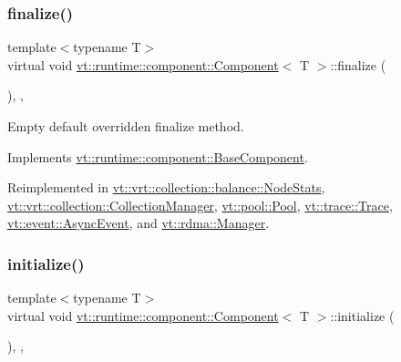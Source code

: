 \subsubsection{\texorpdfstring{finalize()}{finalize()}}
{\footnotesize\ttfamily template$<$typename T$>$ \\
virtual void \hyperlink{structvt_1_1runtime_1_1component_1_1_component}{vt\+::runtime\+::component\+::\+Component}$<$ T $>$\+::finalize (\begin{DoxyParamCaption}{ }\end{DoxyParamCaption})\hspace{0.3cm}{\ttfamily [inline]}, {\ttfamily [override]}, {\ttfamily [virtual]}}



Empty default overridden finalize method. 



Implements \hyperlink{structvt_1_1runtime_1_1component_1_1_base_component_ac03e2177ad2e26b1b8cb94c7e47e3eff}{vt\+::runtime\+::component\+::\+Base\+Component}.



Reimplemented in \hyperlink{structvt_1_1vrt_1_1collection_1_1balance_1_1_node_stats_a267ac0f73734b89797be774b0bd6e7d1}{vt\+::vrt\+::collection\+::balance\+::\+Node\+Stats}, \hyperlink{structvt_1_1vrt_1_1collection_1_1_collection_manager_afafcdbf36f42835471218b654252031c}{vt\+::vrt\+::collection\+::\+Collection\+Manager}, \hyperlink{structvt_1_1pool_1_1_pool_a45a2880809625a77bb93c3dfcd9c7603}{vt\+::pool\+::\+Pool}, \hyperlink{structvt_1_1trace_1_1_trace_a571333fa708843b1b24079eccfc3ba93}{vt\+::trace\+::\+Trace}, \hyperlink{structvt_1_1event_1_1_async_event_a77e3aafaae98603825556cdf8105ba57}{vt\+::event\+::\+Async\+Event}, and \hyperlink{structvt_1_1rdma_1_1_manager_ad4ff20cf1ba6e870326b20900e6eb581}{vt\+::rdma\+::\+Manager}.

\mbox{\label{structvt_1_1runtime_1_1component_1_1_component_a7f07384d294e59796add9ce6be2d6410}} 
\subsubsection{\texorpdfstring{initialize()}{initialize()}}
{\footnotesize\ttfamily template$<$typename T$>$ \\
virtual void \hyperlink{structvt_1_1runtime_1_1component_1_1_component}{vt\+::runtime\+::component\+::\+Component}$<$ T $>$\+::initialize (\begin{DoxyParamCaption}{ }\end{DoxyParamCaption})\hspace{0.3cm}{\ttfamily [inline]}, {\ttfamily [override]}, {\ttfamily [virtual]}}



